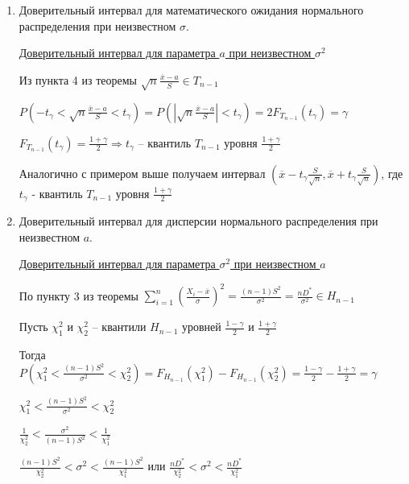\begin{enumerate}
    Доверительный интервал надежности $\gamma$: $\left(\overline{x} - t_\gamma \frac{\sigma}{\sqrt{n}}, 
    \overline{x} + t_\gamma \frac{\sigma}{\sqrt{n}}\right)$, 
    где $t_\gamma$ -- квантиль $N(0, 1)$ уровня $\frac{1 + \gamma}{2}$

    \item Доверительный интервал для математического ожидания нормального распределения при неизвестном $\sigma$.

    \hyperlink{confidence_interval_for_a_unknown_sigma}{Доверительный интервал для параметра $a$ при неизвестном $\sigma^2$}

    Из пункта 4 из теоремы $\sqrt{n} \frac{\overline{x} - a}{S} \in T_{n - 1}$

    $P\left(-t_\gamma < \sqrt{n} \frac{\overline{x} - a}{S} < t_\gamma\right) = P\left(\left|\sqrt{n} \frac{\overline{x} - a}{S}\right| < t_\gamma\right) = 2F_{T_{n - 1}}(t_\gamma) = \gamma$

    $F_{T_{n - 1}}(t_\gamma) = \frac{1 + \gamma}{2} \Longrightarrow t_\gamma$ -- квантиль $T_{n - 1}$ уровня 
    $\frac{1 + \gamma}{2}$

    Аналогично с примером выше получаем интервал $\left(\overline{x} - t_\gamma \frac{S}{\sqrt{n}}, 
    \overline{x} + t_\gamma \frac{S}{\sqrt{n}}\right)$, 
    где $t_\gamma$ - квантиль $T_{n - 1}$ уровня $\frac{1 + \gamma}{2}$

    \item Доверительный интервал для дисперсии нормального распределения при неизвестном $a$.

    \hyperlink{confidence_interval_for_sigma_unknown_a}{Доверительный интервал для параметра $\sigma^2$ при неизвестном $a$}

    По пункту 3 из теоремы $\sum_{i = 1}^n \left(\frac{X_i - \overline{x}}{\sigma}\right)^2 = \frac{(n - 1)S^2}{\sigma^2} = 
    \frac{nD^*}{\sigma^2} \in H_{n - 1}$

    Пусть $\chi_1^2$ и $\chi_2^2$ -- квантили $H_{n - 1}$ уровней $\frac{1 - \gamma}{2}$ и $\frac{1 + \gamma}{2}$

    Тогда $P\left(\chi_1^2 < \frac{(n - 1)S^2}{\sigma^2} < \chi_2^2\right) = F_{H_{n - 1}}(\chi_1^2) - F_{H_{n - 1}}(\chi_2^2) = \frac{1 - \gamma}{2} - \frac{1 + \gamma}{2} = \gamma$

    $\chi_1^2 < \frac{(n - 1)S^2}{\sigma^2} < \chi_2^2$

    $\frac{1}{\chi_2^2} < \frac{\sigma^2}{(n - 1)S^2} < \frac{1}{\chi_1^2}$

    $\frac{(n - 1)S^2}{\chi_2^2} < \sigma^2 < \frac{(n - 1)S^2}{\chi_1^2}$ или 
    $\frac{nD^*}{\chi_2^2} < \sigma^2 < \frac{nD^*}{\chi_1^2}$


\end{enumerate}
